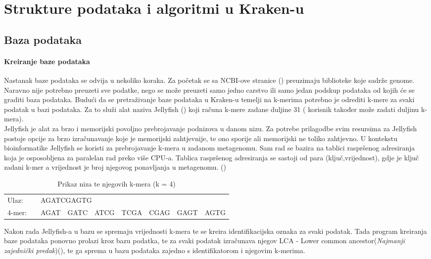 \documentclass[times, utf8, zavrsni]{fer}
\begin{document}
\chapter{Strukture podataka i algoritmi u Kraken-u}
\section{Baza podataka}
\subsubsection{Kreiranje baze podataka}

Nastanak baze podataka se odvija u nekoliko koraka. Za početak se sa NCBI-ove stranice (\cite{NCBI}) preuzimaju biblioteke koje sadrže genome. Naravno nije potrebno preuzeti sve podatke, nego se može preuzeti samo jedno carstvo ili samo jedan podskup podataka od kojih će se graditi baza podataka. Budući da se pretraživanje baze podataka u Kraken-u temelji na k-merima potrebno je odrediti k-mere za svaki podatak u bazi podataka. Za to služi alat naziva Jellyfish (\cite{jellyfish}) koji računa k-mere zadane duljine 31 ( korisnik također može zadati duljinu k-mera).\\Jellyfish je alat za brzo i memorijski povoljno prebrojavanje podnizova u danom nizu. Za potrebe prilagodbe svim resursima za Jellyfish postoje opcije za brzo izračunavanje koje je memorijski zahtjevnije, te ono sporije ali memorijski ne toliko zahtjevno. U kontekstu bioinformatike Jellyfish se koristi za prebrojavanje k-mera u zadanom metagenomu. Sam rad se bazira na tablici raspršenog adresiranja koja je osposobljena za paralelan rad preko više CPU-a. Tablica raspršenog adresiranja se sastoji od para (ključ,vrijednost), gdje je ključ zadani k-mer a vrijednost je broj njegovog ponavljanja u metagenomu. (\cite{jellyfish})
	 	
\begin{table}[hbp]
	\centering
	\caption{Prikaz niza te njegovih k-mera (k = 4)}
	\label{Prikaz k-mera}
	\begin{tabular}{llllllllll}
		Ulaz:  &           & \multicolumn{8}{l}{AGATCGAGTG}                            \\
		4-mer: & \multicolumn{2}{l}{} & AGAT & GATC & ATCG & TCGA & CGAG & GAGT & AGTG
	\end{tabular}
\end{table}
Nakon rada Jellyfish-a u bazu se spremaju vrijednosti k-mera te se kreira identifikacijska oznaka za svaki podatak. Tada program kreiranja baze podataka ponovno prolazi kroz bazu podatka, te za svaki podatak izračunava njegov LCA - Lower common ancestor(\textit{Najmanji zajednički predak})(\cite{lca1,lca2,lca3}), te ga sprema u bazu podataka zajedno s identifikatorom i njegovim k-merima.
\end{document}
